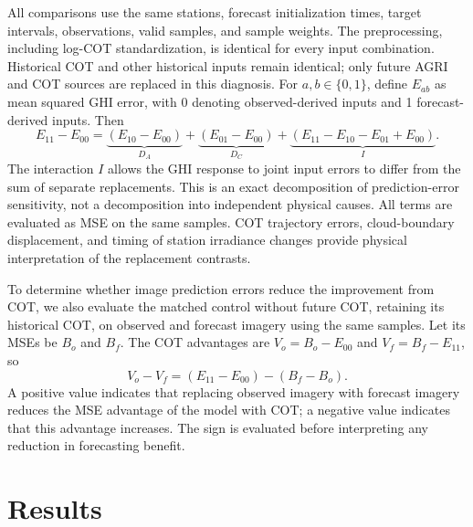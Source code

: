 \documentclass[11pt]{article}
\begin{document}
All comparisons use the same stations, forecast initialization times, target intervals, observations, valid samples, and sample weights. The preprocessing, including log-COT standardization, is identical for every input combination. Historical COT and other historical inputs remain identical; only future AGRI and COT sources are replaced in this diagnosis. For $a,b\in\{0,1\}$, define $E_{ab}$ as mean squared GHI error, with 0 denoting observed-derived inputs and 1 forecast-derived inputs. Then
\begin{equation}
E_{11}-E_{00}=\underbrace{(E_{10}-E_{00})}_{D_A}
+\underbrace{(E_{01}-E_{00})}_{D_C}
+\underbrace{(E_{11}-E_{10}-E_{01}+E_{00})}_{I}.
\label{eq:propagation}
\end{equation}
The interaction $I$ allows the GHI response to joint input errors to differ from the sum of separate replacements. This is an exact decomposition of prediction-error sensitivity, not a decomposition into independent physical causes. All terms are evaluated as MSE on the same samples. COT trajectory errors, cloud-boundary displacement, and timing of station irradiance changes provide physical interpretation of the replacement contrasts.

To determine whether image prediction errors reduce the improvement from COT, we also evaluate the matched control without future COT, retaining its historical COT, on observed and forecast imagery using the same samples. Let its MSEs be $B_o$ and $B_f$. The COT advantages are $V_o=B_o-E_{00}$ and $V_f=B_f-E_{11}$, so
\begin{equation}
V_o-V_f=(E_{11}-E_{00})-(B_f-B_o).
\label{eq:value-loss}
\end{equation}
A positive value indicates that replacing observed imagery with forecast imagery reduces the MSE advantage of the model with COT; a negative value indicates that this advantage increases. The sign is evaluated before interpreting any reduction in forecasting benefit.

\FloatBarrier
\section{Results}
\end{document}
